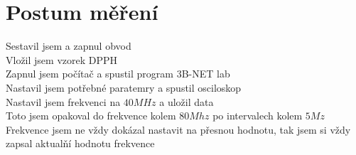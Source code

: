 \documentclass{article}
\begin{document}
\section{Postum měření}
Sestavil jsem a zapnul obvod\\
Vložil jsem vzorek DPPH\\
Zapnul jsem počítač a spustil program 3B-NET lab\\
Nastavil jsem potřebné paratemry a spustil osciloskop\\
Nastavil jsem frekvenci na $40 MHz$ a uložil data\\
Toto jsem opakoval do frekvence kolem $80 Mhz$ po intervalech kolem $5Mz$\\
Frekvence jsem ne vždy dokázal nastavit na přesnou hodnotu, tak jsem si vždy zapsal aktualňí hodnotu frekvence\\
\end{document}
